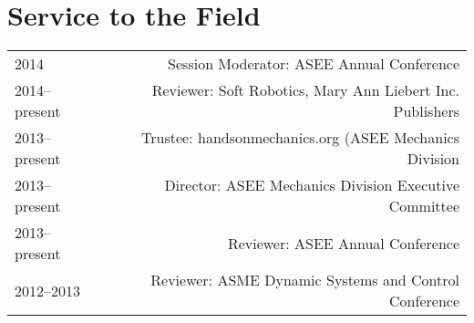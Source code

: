 \section*{Service to the Field}
\begin{tabular}{L!{\VRule}R}
2014&Session Moderator: ASEE Annual Conference\\
2014--present&Reviewer: Soft Robotics, Mary Ann Liebert Inc. Publishers\\
2013--present&Trustee: handsonmechanics.org (ASEE Mechanics Division\\
2013--present&Director: ASEE Mechanics Division Executive Committee\\
2013--present&Reviewer: ASEE Annual Conference\\
2012--2013&Reviewer: ASME Dynamic Systems and Control Conference\\
\end{tabular}